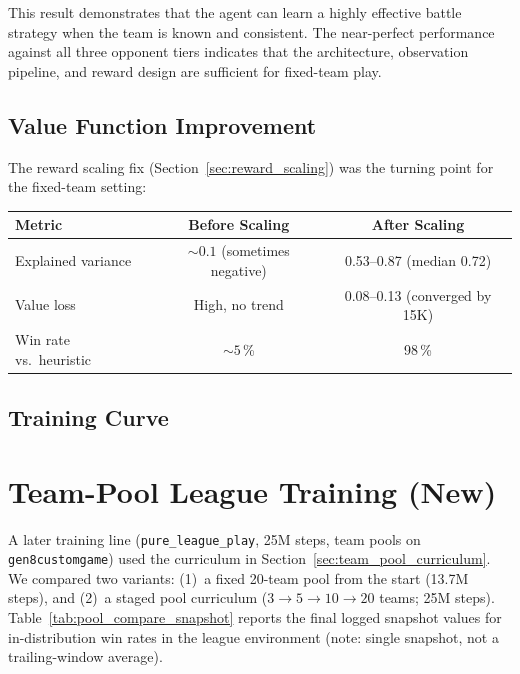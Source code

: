 This result demonstrates that the agent can learn a highly effective battle
strategy when the team is known and consistent.  The near-perfect performance
against all three opponent tiers indicates that the architecture, observation
pipeline, and reward design are sufficient for fixed-team play.

\subsection{Value Function Improvement}

The reward scaling fix (Section~\ref{sec:reward_scaling}) was the turning
point for the fixed-team setting:

\begin{center}
\small
\begin{tabularx}{\textwidth}{l c c}
  \toprule
  \textbf{Metric} & \textbf{Before Scaling} & \textbf{After Scaling} \\
  \midrule
  Explained variance & ${\sim}0.1$ (sometimes negative) & 0.53--0.87 (median 0.72) \\
  Value loss         & High, no trend                     & 0.08--0.13 (converged by 15K) \\
  Win rate vs.\ heuristic & ${\sim}5$\,\%               & 98\,\% \\
  \bottomrule
\end{tabularx}
\end{center}


\subsection{Training Curve}

\section{Team-Pool League Training (New)}
\label{sec:league_results}

A later training line (\texttt{pure\_league\_play}, 25M steps, team pools on
\texttt{gen8customgame}) used the curriculum in
Section~\ref{sec:team_pool_curriculum}.  We compared two variants:
(1)~a fixed 20-team pool from the start (13.7M steps), and
(2)~a staged pool curriculum ($3 \to 5 \to 10 \to 20$ teams; 25M steps).
Table~\ref{tab:pool_compare_snapshot} reports the final logged snapshot values
for in-distribution win rates in the league environment (note: single snapshot,
not a trailing-window average).

